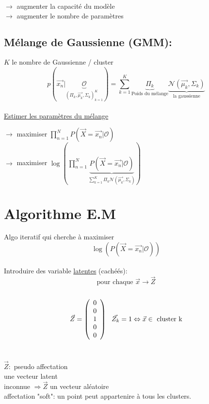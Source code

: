 \documentclass{article}
\newlength\tindent
\renewcommand{\indent}{\hspace*{\tindent}}
\newcommand{\tikzmark}[1]{\tikz[baseline,remember picture] \coordinate (#1) {};}
\newcommand{\Napp}{\mathcal{N}}
\newcommand{\Oapp}{\mathcal{O}}
\begin{document}
$\rightarrow$ augmenter la capacité du modèle\\
$\rightarrow$ augmenter le nombre de paramètres\\

\subsection{Mélange de Gaussienne (GMM):}
$K$ le nombre de Gaussienne / cluster\\
$$p(\vec{x_n}|\underbrace{\Oapp}_{(\Pi_k,\vec{\mu_k},\Sigma_k)^K_{k=1}}) = \sum^K_{k=1}\underbrace{\Pi_k}_{\text{Poids du mélange}} \underbrace{\Napp(\vec{\mu_k}, \Sigma_k)}_{\text{la gaussienne}}$$\\

\underline{Estimer les paramètres du mélange}
\vspace{1em}

$\rightarrow$ maximiser $\prod^N_{n=1} P(\vec{X}=\vec{x_n}|\Oapp)$\\
$\rightarrow$ maximiser $\log( \prod^N_{n=1} \underbrace{P(\vec{X}=\vec{x_n}|\Oapp)}_{\sum^K_{k=1}\Pi_k\Napp(\vec{\mu_k}, \Sigma_k)})$\\

\section{Algorithme E.M}
\textbullet Algo iteratif qui cherche à maximiser $$\log(P(\vec{X}=\vec{x_n}|\Oapp))$$\\
\textbullet Introduire des variable \underline{latentes} (cachéés): $$\text{pour chaque } \vec{x} \rightarrow \vec{Z}$$\\
$$\vec{Z} = \left( \begin{array}{l} 0\\0\\1\tikzmark{Zks}\\0\\0 \end{array} \right)\ \ \tikzmark{Zke}\vec{Z_k} = 1 \Leftrightarrow \vec{x}\in\text{ cluster k}$$\\

$\vec{Z}:$ \textbullet pseudo affectation\\
\indent \textbullet une vecteur latent\\
\indent \textbullet inconnue $\Rightarrow \vec{Z}$ un vecteur aléatoire\\
\indent \textbullet affectation "soft": un point peut appartenire à tous les clusters.\\
\vspace{1em}
\end{document}
